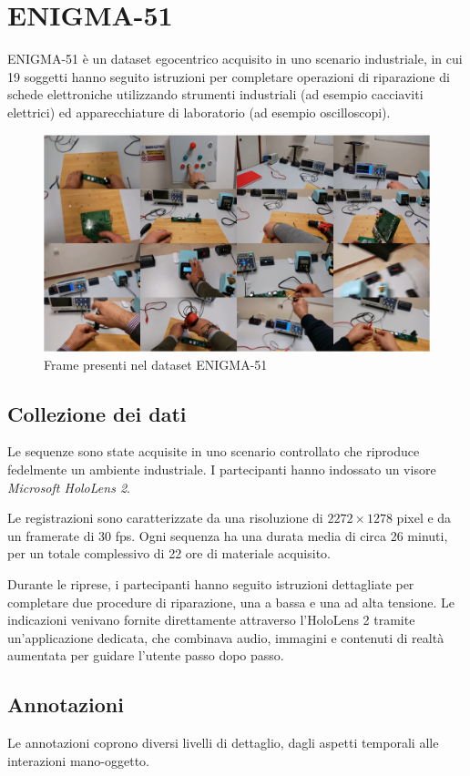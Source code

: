 \section{ENIGMA-51}
ENIGMA-51 è un dataset egocentrico acquisito in uno scenario industriale, in cui 19 soggetti hanno seguito istruzioni per completare operazioni di riparazione di schede elettroniche utilizzando strumenti industriali (ad esempio cacciaviti elettrici) ed apparecchiature di laboratorio (ad esempio oscilloscopi).  

\begin{figure}[ht]
    \centering
    \includegraphics[width=0.8\linewidth]{Images/enigma_ex.png}
    \caption{Frame presenti nel dataset ENIGMA-51}
\end{figure}

\subsection*{Collezione dei dati}
Le sequenze sono state acquisite in uno scenario controllato che riproduce fedelmente un ambiente industriale. I partecipanti hanno indossato un visore \emph{Microsoft HoloLens 2}.

Le registrazioni sono caratterizzate da una risoluzione di $2272 \times 1278$ pixel e da un framerate di 30 fps. Ogni sequenza ha una durata media di circa 26 minuti, per un totale complessivo di 22 ore di materiale acquisito.  

Durante le riprese, i partecipanti hanno seguito istruzioni dettagliate per completare due procedure di riparazione, una a bassa e una ad alta tensione. Le indicazioni venivano fornite direttamente attraverso l'HoloLens 2 tramite un'applicazione dedicata, che combinava audio, immagini e contenuti di realtà aumentata per guidare l'utente passo dopo passo.

\subsection*{Annotazioni}
Le annotazioni coprono diversi livelli di dettaglio, dagli aspetti temporali alle interazioni mano-oggetto.

